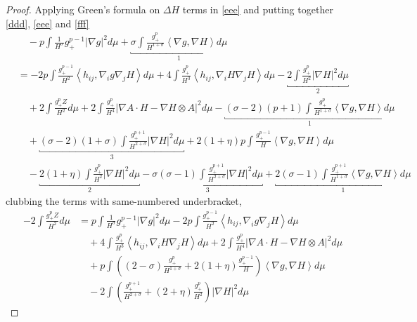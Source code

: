 \begin{proof}
    Applying Green's formula on $ \Delta H $ terms in \cref{eee} and putting together \cref{ddd}, \cref{eee} and \cref{fff} 
    \begin{align*}
        & \quad -p \int \frac{1}{H^{\sigma}}g_{+}^{p-1}|\nabla g|^{2}d \mu+ \underbracket{\sigma \int \frac{g_{+}^{p}}{H^{1+\sigma}}\left<  \nabla g,\nabla H \right>d \mu}_{1} \\
        & = -2p \int \frac{g_{+}^{p-1}}{H^{2}} \left< h_{ij}, \nabla_{i}g \nabla_{j}H \right>d \mu + 4 \int \frac{g_{+}^{p}}{H^{3}} \left<  h_{ij}, \nabla_{i}H\nabla_{j}H  \right>d \mu -\underbracket{2 \int \frac{g_{+}^{p}}{H^{2}}|\nabla H|^{2}d \mu}_{2}  \\
        & \quad + 2 \int \frac{g_{+}^{p}Z}{H^{2}}d \mu + 2 \int \frac{g_{+}^{p}}{H^{4}}| \nabla A \cdot H - \nabla H \otimes A|^{2}d \mu - \underbracket{(\sigma -2 )(p+1)\int \frac{g_{+}^{p}}{H^{1+\sigma}} \left< \nabla g, \nabla H \right> d \mu}_{1} \\
        & \quad + \underbracket{(\sigma-2)(1+\sigma) \int \frac{g_{+}^{p+1}}{H^{2+\sigma}}|\nabla H|^{2} d \mu}_{3}  + 2(1+\eta)p \int \frac{g_{+}^{p-1}}{H}\left< \nabla g , \nabla H\right>d \mu \\
        & \quad -\underbracket{2(1+\eta) \int \frac{g_{+}^{p}}{H^{2}}| \nabla H|^{2} d \mu}_{2} - \underbracket{\sigma(\sigma-1)\int \frac{g_{+}^{p+1}}{H^{2+\sigma}}|\nabla H|^{2}d \mu}_{3} + \underbracket{2(\sigma -1) \int \frac{g_{+}^{p+1}}{H^{1+\sigma}}\left< \nabla g, \nabla H \right>d \mu}_{1}
    \end{align*}
    clubbing the terms with same-numbered underbracket,  \begin{align}
        -2 \int \frac{g_{+}^{p}Z}{H^{2}}d \mu & = p \int \frac{1}{H^{\sigma}}g_{+}^{p-1}|\nabla g|^{2}d \mu-2p \int \frac{g_{+}^{p-1}}{H^{2}} \left< h_{ij}, \nabla_{i}g \nabla_{j}H \right>d \mu \nonumber\\
        & \quad + 4 \int \frac{g_{+}^{p}}{H^{3}} \left<  h_{ij}, \nabla_{i}H\nabla_{j}H  \right>d \mu + 2 \int \frac{g_{+}^{p}}{H^{4}}| \nabla A \cdot H - \nabla H \otimes A|^{2}d \mu \nonumber \\
        & \quad + p \int \left( (2-\sigma) \frac{g_{+}^{p}}{H^{1+\sigma}}+ 2(1+\eta) \frac{g_{+}^{p-1}}{H} \right)\left< \nabla g, \nabla H \right>d \mu \nonumber \\
        & \quad -2 \int \left( \frac{g_{+}^{p+1}}{H^{2+\sigma}}+ (2+\eta) \frac{g_{+}^{p}}{H^{2}} \right) | \nabla H|^{2}d \mu \label{ggg}
    \end{align}


\end{proof}
